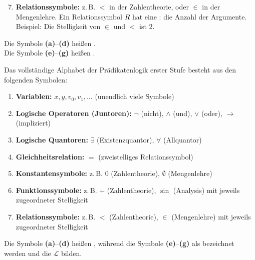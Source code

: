 \begin{math-stroke}
\begin{enumerate}[label=\textbf{(\alph*)}]
    \setcounter{enumi}{6}
    \item \textbf{Relationssymbole:} z.\,B. $<$ in der Zahlentheorie, oder $\in$ in der Mengenlehre. Ein Relationssymbol $R$ hat eine : die Anzahl der Argumente. Beispiel: Die Stelligkeit von $\in$ und $<$ ist $2$.
\end{enumerate}

\par\vspace{1ex}\noindent
Die Symbole \textbf{(a)}--\textbf{(d)} heißen . \\
Die Symbole \textbf{(e)}--\textbf{(g)} heißen .
\end{math-stroke}

\begin{math-stroke}
\end{math-stroke}

\begin{math-stroke}
Das vollständige Alphabet der Prädikatenlogik erster Stufe besteht aus den folgenden Symbolen:
\begin{enumerate}[label=\textbf{(\alph*)}]
    \item \textbf{Variablen:} $x, y, v_0, v_1, \dots$ (unendlich viele Symbole)
    \item \textbf{Logische Operatoren (Juntoren):} $\neg$ (nicht), $\wedge$ (und), $\vee$ (oder), $\rightarrow$ (impliziert)
    \item \textbf{Logische Quantoren:} $\exists$ (Existenzquantor), $\forall$ (Allquantor)
    \item \textbf{Gleichheitsrelation:} $=$ (zweistelliges Relationssymbol)
    \item \textbf{Konstantensymbole:} z.\,B. $0$ (Zahlentheorie), $\emptyset$ (Mengenlehre)
    \item \textbf{Funktionssymbole:} z.\,B. $+$ (Zahlentheorie), $\sin$ (Analysis) mit jeweils zugeordneter Stelligkeit
    \item \textbf{Relationssymbole:} z.\,B. $<$ (Zahlentheorie), $\in$ (Mengenlehre) mit jeweils zugeordneter Stelligkeit
\end{enumerate}
\par\vspace{1ex}\noindent
Die Symbole \textbf{(a)}--\textbf{(d)} heißen , während die Symbole \textbf{(e)}--\textbf{(g)} als  bezeichnet werden und die  $\mathcal{L}$ bilden.
\end{math-stroke}

